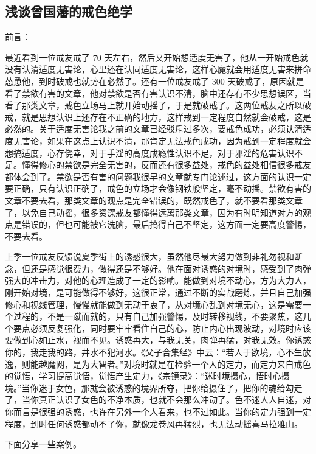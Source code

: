 \subsection{浅谈曾国藩的戒色绝学}

前言：

最近看到一位戒友戒了 70 天左右，然后又开始想适度无害了，他从一开始戒色就没有认清适度无害论，心里还在认同适度无害论，这样心魔就会用适度无害来拼命怂恿他，到时破戒也就势在必然了。还有一位戒友戒了 300 天破戒了，原因就是看了禁欲有害的文章，他对禁欲是否有害认识不清，脑中还存有不少思想误区，当看了那类文章，戒色立场马上就开始动摇了，于是就破戒了。这两位戒友之所以破戒，就是思想认识上还存在不正确的地方，这样戒到一定程度自然就会破戒，这是必然的。关于适度无害论我之前的文章已经驳斥过多次，要戒色成功，必须认清适度无害论，如果在这点上认识不清，那肯定无法戒色成功，因为戒到一定程度就会想搞适度，心存侥幸，对于手淫的高度成瘾性认识不足，对于邪淫的危害认识不足。懂得修心的禁欲是完全无害的，反而还有很多益处，戒色的益处相信很多戒友都体会到了。禁欲是否有害的问题我很早的文章就专门论述过，这方面的认识一定要正确，只有认识正确了，戒色的立场才会像钢铁般坚定，毫不动摇。禁欲有害的文章不要去看，那类文章的观点是完全错误的，既然戒色了，就不要看那类文章了，以免自己动摇，很多资深戒友都懂得远离那类文章，因为有时明知道对方的观点是错误的，但也可能被它洗脑，最后搞得自己不坚定，这方面一定要高度警惕，不要去看。

上季一位戒友反馈说夏季街上的诱惑很大，虽然他尽最大努力做到非礼勿视和断念，但还是感觉很费力，做得还是不够好。他在面对诱惑的对境时，感受到了肉弹强大的冲击力，对他的心理造成了一定的影响。能做到对境不动心，方为大力人，刚开始对境，是可能做得不够好，这很正常，通过不断的实战磨炼，并且自己加强修心和视线管理，慢慢就能做到无动于衷了，从对境心乱到对境无心，这是需要一个过程的，不是一蹴而就的，只有自己加强警惕，及时转移视线，不要聚焦，这几个要点必须反复强化，同时要牢牢看住自己的心，防止内心出现波动，对境时应该要做到心如止水，视而不见。诱惑再大，与我无关，肉弹再猛，对我无效。你诱惑你的，我走我的路，井水不犯河水。《父子合集经》中云：“若人于欲境，心不生放逸，则能越魔网，是为大智者。”对境时就是在检验一个人的定力，而定力来自戒色的觉悟，学习提高觉悟，觉悟产生定力，《宗镜录》：“迷时境摄心，悟时心摄境。”当你迷于女色，那就会被诱惑的境界所夺，把你给摄住了，把你的魂给勾走了，当你真正认识了女色的不净本质，也就不会那么冲动了。色不迷人人自迷，对你而言是很强的诱惑，也许在另外一个人看来，也不过如此。当你的定力强到一定程度，到时任何诱惑都动不了你，就像龙卷风再猛烈，也无法动摇喜马拉雅山。

下面分享一些案例。

